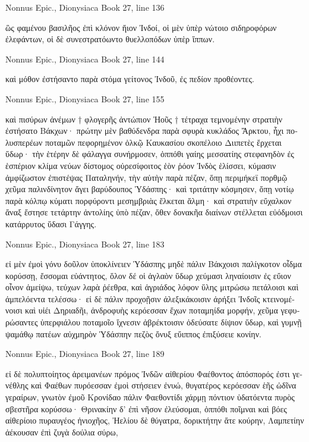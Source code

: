 \documentclass[12pt,letterpaper,twoside,final]{memoir}
\begin{document}
\begin{greek}
Nonnus Epic., Dionysiaca 
Book 27, line 136

ὣς φαμένου βασιλῆος ἐπὶ κλόνον ἤιον Ἰνδοί, 
οἱ μὲν ὑπὲρ νώτοιο σιδηροφόρων ἐλεφάντων, 
οἱ δὲ συνεστρατόωντο θυελλοπόδων ὑπὲρ ἵππων. 



Nonnus Epic., Dionysiaca 
Book 27, line 144

καὶ μόθον ἐστήσαντο παρὰ στόμα γείτονος Ἰνδοῦ, 
ἐς πεδίον προθέοντες. 



Nonnus Epic., Dionysiaca 
Book 27, line 155

καὶ πισύρων ἀνέμων † φλογερῆς ἀντώπιον Ἠοῦς † 
τέτραχα τεμνομένην στρατιὴν ἐστήσατο Βάκχων· 
πρώτην μὲν βαθύδενδρα παρὰ σφυρὰ κυκλάδος Ἄρκτου, 
ἧχι πολυσπερέων ποταμῶν πεφορημένον ὁλκῷ 
Καυκασίου σκοπέλοιο Διιπετὲς ἔρχεται ὕδωρ·   
τὴν ἑτέρην δὲ φάλαγγα συνήρμοσεν, ὁππόθι γαίης 
μεσσατίης στεφανηδὸν ἐς ἑσπέριον κλίμα νεύων 
δίστομος οὐρεσίφοιτος ἑὸν ῥόον Ἰνδὸς ἑλίσσει, 
κύμασιν ἀμφίζωστον ἐπιστέψας Παταληνήν, 
τὴν αὐτὴν παρὰ πέζαν, ὅπῃ περιμήκεϊ πορθμῷ 
χεῦμα παλινδίνητον ἄγει βαρύδουπος Ὑδάσπης· 
καὶ τριτάτην κόσμησεν, ὅπῃ νοτίῳ παρὰ κόλπῳ 
κύματι πορφύροντι μεσημβριὰς ἕλκεται ἅλμη· 
καὶ στρατιὴν εὔχαλκον ἄναξ ἔστησε τετάρτην 
ἀντολίης ὑπὸ πέζαν, ὅθεν δονακῆα διαίνων 
στέλλεται εὐόδμοισι κατάρρυτος ὕδασι Γάγγης. 



Nonnus Epic., Dionysiaca 
Book 27, line 183

εἰ μὲν ἐμοὶ γόνυ δοῦλον ὑποκλίνειεν Ὑδάσπης 
μηδὲ πάλιν Βάκχοισι παλίγκοτον οἶδμα κορύσσῃ, 
ἔσσομαι εὐάντητος, ὅλον δέ οἱ ἀγλαὸν ὕδωρ   
χεύμασι ληναίοισιν ἐς εὔιον οἶνον ἀμείψω, 
τεύχων λαρὰ ῥέεθρα, καὶ ἀγριάδος λόφον ὕλης 
μιτρώσω πετάλοισι καὶ ἀμπελόεντα τελέσσω· 
εἰ δὲ πάλιν προχοῇσιν ἀλεξικάκοισιν ἀρήξει 
Ἰνδοῖς κτεινομένοισι καὶ υἱέι Δηριαδῆι, 
ἀνδροφυὴς κερόεσσαν ἔχων ποταμηίδα μορφήν, 
χεῦμα γεφυρώσαντες ὑπερφιάλου ποταμοῖο 
ἴχνεσιν ἀβρέκτοισιν ὁδεύσατε δίψιον ὕδωρ, 
καὶ γυμνῇ ψαμάθῳ πατέων αὐχμηρὸν Ὑδάσπην 
πεζὸς ὄνυξ εὔιππος ἐπιξύσειε κονίην. 



Nonnus Epic., Dionysiaca 
Book 27, line 189

εἰ δὲ πολυπτοίητος ἀρειμανέων πρόμος Ἰνδῶν 
αἰθερίου Φαέθοντος ἀπόσπορός ἐστι γενέθλης 
καὶ Φαέθων πυρόεσσαν ἐμοὶ στήσειεν ἐνυώ, 
θυγατέρος κερόεσσαν ἑῆς ὠδῖνα γεραίρων, 
γνωτὸν ἐμοῦ Κρονίδαο πάλιν Φαεθοντίδι χάρμῃ 
πόντιον ὑδατόεντα πυρὸς σβεστῆρα κορύσσω· 
Θρινακίην δ' ἐπὶ νῆσον ἐλεύσομαι, ὁππόθι ποῖμναι 
καὶ βόες αἰθερίοιο πυραυγέος ἡνιοχῆος, 
Ἠελίου δὲ θύγατρα, δορικτήτην ἅτε κούρην, 
Λαμπετίην ἀέκουσαν ἐπὶ ζυγὰ δούλια σύρω, 





\end{greek}
\end{document}

